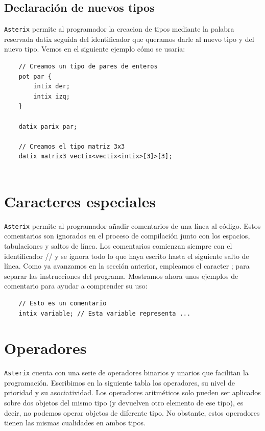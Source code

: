 \documentclass[a4paper, 10pt]{article}
\newcommand{\atx}{\texttt{Asterix} }
\begin{document}
    \subsection*{Declaración de nuevos tipos}
    \atx permite al programador la creacion de tipos mediante la palabra reservada 
    \textsf{datix} seguida del identificador que queramos darle al nuevo tipo
    y del nuevo tipo. Vemos en el siguiente ejemplo cómo se usaría:

    \begin{verbatim}
    // Creamos un tipo de pares de enteros
    pot par {
        intix der;
        intix izq;
    }

    datix parix par;

    // Creamos el tipo matriz 3x3
    datix matrix3 vectix<vectix<intix>[3]>[3];
    
    \end{verbatim}


    \section*{Caracteres especiales}
    \atx permite al programador añadir comentarios de una línea al código. Estos
    comentarios son ignorados en el proceso de compilación junto con los espacios,
    tabulaciones y saltos de línea. Los comentarios comienzan siempre con el
    identificador // y se ignora todo lo que haya escrito hasta el siguiente
    salto de línea. Como ya avanzamos en la sección anterior, empleamos el
    caracter \textsc{;} para separar las instrucciones del programa. Mostramos
    ahora unos ejemplos de comentario para ayudar a comprender su uso:

    \begin{verbatim}
    // Esto es un comentario
    intix variable; // Esta variable representa ...
    \end{verbatim}

    \section*{Operadores}
    \atx cuenta con una serie de operadores binarios y unarios que facilitan
    la programación. 
    Escribimos en la siguiente tabla los operadores, su nivel de prioridad y 
    su asociatividad. Los operadores aritméticos solo pueden ser aplicados 
    sobre dos objetos del mismo tipo (y devuelven otro elemento de ese tipo),
    es decir, no podemos operar objetos de diferente tipo. No obstante, estos
    operadores tienen las mismas cualidades en ambos tipos.
\end{document}

